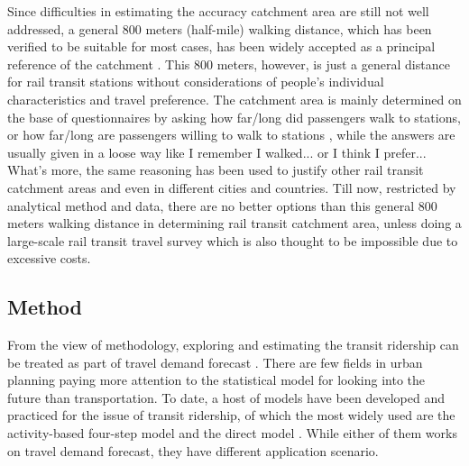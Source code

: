 Since difficulties in estimating the accuracy catchment area are still not well addressed, a general 800 meters (half-mile) walking distance, which has been verified to be suitable for most cases, has been widely accepted as a principal reference of the catchment \cite{kuby2004factors,gutierrez2011transit,cardozo2012application,zhao2013influences}. This 800 meters, however, is just a general distance for rail transit stations without considerations of people's individual characteristics and travel preference. The catchment area is mainly determined on the base of questionnaires by asking how far/long did passengers walk to stations, or how far/long are passengers willing to walk to stations \cite{keijer2000people,zhao2003forecasting,garcia2013walking}, while the answers are usually given in a loose way like I remember I walked... or I think I prefer... What's more, the same reasoning has been used to justify other rail transit catchment areas and even in different cities and countries. Till now, restricted by analytical method and data, there are no better options than this general 800 meters walking distance in determining rail transit catchment area, unless doing a large-scale rail transit travel survey which is also thought to be impossible due to excessive costs.

%
\subsection{Method}
From the view of methodology, exploring and estimating the transit ridership can be treated as part of travel demand forecast \cite{miller1999potential,boyce1994introducing}. There are few fields in urban planning paying more attention to the statistical model for looking into the future than transportation. To date, a host of models have been developed and practiced for the issue of transit ridership, of which the most widely used are the activity-based four-step model and the direct model \cite{mcnally2007four,ewing2010travel}. While either of them works on travel demand forecast, they have different application scenario.

